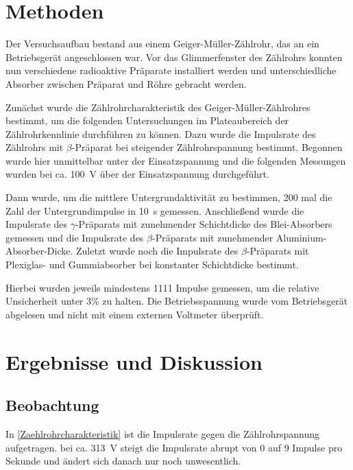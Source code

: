 \documentclass[
	a4paper,
	12pt,
	pagesize,
	ngerman
]{scrartcl}
\begin{document}
	\section{Methoden}\label{Methoden}
	Der Versuchsaufbau bestand aus einem Geiger-Müller-Zählrohr, das an ein Betriebsgerät angeschlossen war.
	Vor das Glimmerfenster des Zählrohrs konnten nun verschiedene radioaktive Präparate installiert werden und unterschiedliche Absorber zwischen Präparat und Röhre gebracht werden.
	
	Zunächst wurde die Zählrohrcharakteristik des Geiger-Müller-Zählrohres bestimmt, um die folgenden Untersuchungen im Plateaubereich der Zählrohrkennlinie durchführen zu können.
	Dazu wurde die Impulsrate des Zählrohrs mit $\beta$-Präparat bei steigender Zählrohrspannung bestimmt.
	Begonnen wurde hier unmittelbar unter der Einsatzspannung und die folgenden Messungen wurden bei ca. \SI{100}{\volt} über der Einsatzspannung durchgeführt.
	
	Dann wurde, um die mittlere Untergrundaktivität zu bestimmen, 200 mal die Zahl der Untergrundimpulse in \SI{10}{\second} gemessen.
	Anschließend wurde die Impulsrate des $\gamma$-Präparats mit zunehmender Schichtdicke des Blei-Absorbers gemessen und die Impulsrate des $\beta$-Präparats mit zunehmender Aluminium-Absorber-Dicke.
	Zuletzt wurde noch die Impulsrate des $\beta$-Präparats mit Plexiglas- und Gummiabsorber bei konstanter Schichtdicke bestimmt.
	
	Hierbei wurden jeweils mindestens 1111 Impulse gemessen, um die relative Unsicherheit unter 3\% zu halten.
	Die Betriebsspannung wurde vom Betriebsgerät abgelesen und nicht mit einem externen Voltmeter überprüft.
	
	
	\section{Ergebnisse und Diskussion}
	

	\subsection{Beobachtung}
	In \cref{Zaehlrohrcharakteristik} ist die Impulsrate gegen die Zählrohrspannung aufgetragen.
	bei ca. \SI{313}{\volt} steigt die Impulsrate abrupt von 0 auf 9 Impulse pro Sekunde und ändert sich danach nur noch unwesentlich. %
\end{document}
